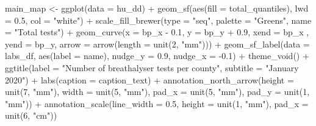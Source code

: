 \documentclass[
]{book}
\newenvironment{Shaded}{\begin{snugshade}}{\end{snugshade}}
\newcommand{\AttributeTok}[1]{\textcolor[rgb]{0.77,0.63,0.00}{#1}}
\newcommand{\DecValTok}[1]{\textcolor[rgb]{0.00,0.00,0.81}{#1}}
\newcommand{\FloatTok}[1]{\textcolor[rgb]{0.00,0.00,0.81}{#1}}
\newcommand{\FunctionTok}[1]{\textcolor[rgb]{0.00,0.00,0.00}{#1}}
\newcommand{\NormalTok}[1]{#1}
\newcommand{\OtherTok}[1]{\textcolor[rgb]{0.56,0.35,0.01}{#1}}
\newcommand{\SpecialCharTok}[1]{\textcolor[rgb]{0.00,0.00,0.00}{#1}}
\newcommand{\StringTok}[1]{\textcolor[rgb]{0.31,0.60,0.02}{#1}}
\begin{document}
\begin{Shaded}
\begin{Highlighting}[]
\NormalTok{main\_map }\OtherTok{\textless{}{-}} \FunctionTok{ggplot}\NormalTok{(}\AttributeTok{data =}\NormalTok{ hu\_dd) }\SpecialCharTok{+} 
  \FunctionTok{geom\_sf}\NormalTok{(}\FunctionTok{aes}\NormalTok{(}\AttributeTok{fill =}\NormalTok{ total\_quantiles), }
          \AttributeTok{lwd =} \FloatTok{0.5}\NormalTok{, }
          \AttributeTok{col =} \StringTok{"white"}\NormalTok{) }\SpecialCharTok{+} 
  \FunctionTok{scale\_fill\_brewer}\NormalTok{(}\AttributeTok{type =} \StringTok{"seq"}\NormalTok{, }
                    \AttributeTok{palette =} \StringTok{"Greens"}\NormalTok{, }
                    \AttributeTok{name =} \StringTok{"Total tests"}\NormalTok{) }\SpecialCharTok{+} 
  \FunctionTok{geom\_curve}\NormalTok{(}\AttributeTok{x =}\NormalTok{ bp\_x }\SpecialCharTok{{-}} \FloatTok{0.1}\NormalTok{, }
             \AttributeTok{y =}\NormalTok{ bp\_y }\SpecialCharTok{+} \FloatTok{0.9}\NormalTok{, }
             \AttributeTok{xend =}\NormalTok{ bp\_x , }
             \AttributeTok{yend =}\NormalTok{ bp\_y, }
             \AttributeTok{arrow =} \FunctionTok{arrow}\NormalTok{(}\AttributeTok{length =} \FunctionTok{unit}\NormalTok{(}\DecValTok{2}\NormalTok{, }\StringTok{"mm"}\NormalTok{))) }\SpecialCharTok{+}
  \FunctionTok{geom\_sf\_label}\NormalTok{(}\AttributeTok{data =}\NormalTok{ labs\_df, }
                \FunctionTok{aes}\NormalTok{(}\AttributeTok{label =}\NormalTok{ name), }
                \AttributeTok{nudge\_y =} \FloatTok{0.9}\NormalTok{, }
                \AttributeTok{nudge\_x =} \SpecialCharTok{{-}}\FloatTok{0.1}\NormalTok{) }\SpecialCharTok{+} 
  \FunctionTok{theme\_void}\NormalTok{() }\SpecialCharTok{+} 
  \FunctionTok{ggtitle}\NormalTok{(}\AttributeTok{label =} \StringTok{"Number of breathalyser tests per county"}\NormalTok{, }
          \AttributeTok{subtitle =} \StringTok{"January 2020"}\NormalTok{) }\SpecialCharTok{+} 
  \FunctionTok{labs}\NormalTok{(}\AttributeTok{caption =}\NormalTok{ caption\_text) }\SpecialCharTok{+} 
  \FunctionTok{annotation\_north\_arrow}\NormalTok{(}\AttributeTok{height =} \FunctionTok{unit}\NormalTok{(}\DecValTok{7}\NormalTok{, }\StringTok{"mm"}\NormalTok{), }
                         \AttributeTok{width =} \FunctionTok{unit}\NormalTok{(}\DecValTok{5}\NormalTok{, }\StringTok{"mm"}\NormalTok{), }
                         \AttributeTok{pad\_x =} \FunctionTok{unit}\NormalTok{(}\DecValTok{5}\NormalTok{, }\StringTok{"mm"}\NormalTok{), }
                         \AttributeTok{pad\_y =} \FunctionTok{unit}\NormalTok{(}\DecValTok{1}\NormalTok{, }\StringTok{"mm"}\NormalTok{)) }\SpecialCharTok{+} 
  \FunctionTok{annotation\_scale}\NormalTok{(}\AttributeTok{line\_width =} \FloatTok{0.5}\NormalTok{, }
                   \AttributeTok{height =} \FunctionTok{unit}\NormalTok{(}\DecValTok{1}\NormalTok{, }\StringTok{"mm"}\NormalTok{), }
                   \AttributeTok{pad\_x =} \FunctionTok{unit}\NormalTok{(}\DecValTok{6}\NormalTok{, }\StringTok{"cm"}\NormalTok{)) }
\end{Highlighting}
\end{Shaded}
\end{document}
